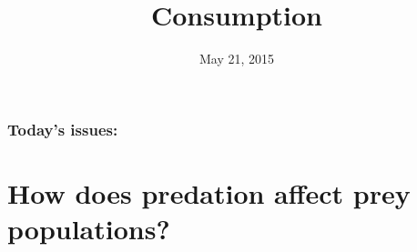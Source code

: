 





\title[Consumption]{Consumption}
\date{May 21, 2015}




\begin{noheadline}
\maketitle
\end{noheadline}


\begin{noheadline}
\begin{frame}
\frametitle{Today's issues:}
\vspace{5mm}
\tableofcontents
\end{frame}
\end{noheadline}

\section{How does predation affect prey populations?}

